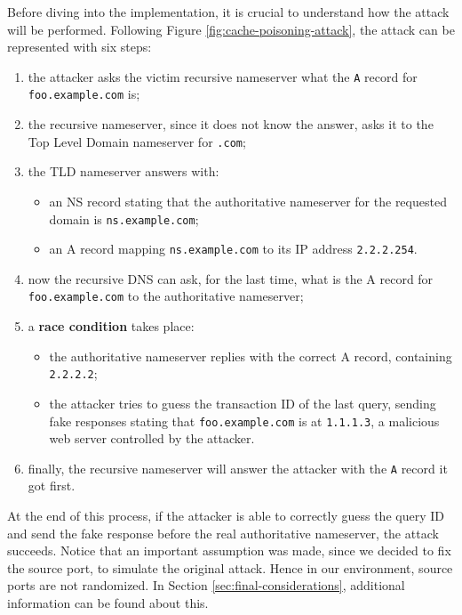\documentclass[11pt,a4paper]{article}
\begin{document}
\noindent
Before diving into the implementation, it is crucial to understand how the attack will be performed. Following Figure \ref{fig:cache-poisoning-attack}, the attack can be represented with six steps:
\begin{enumerate}
    \item the attacker asks the victim recursive nameserver what the \texttt{A} record for\\\texttt{foo.example.com} is;
    \item the recursive nameserver, since it does not know the answer, asks it to the Top Level Domain nameserver for \texttt{.com};
    \item the TLD nameserver answers with: 
    \begin{itemize}
        \item an NS record stating that the authoritative nameserver for the requested domain is \texttt{ns.example.com};
        \item an A record mapping \texttt{ns.example.com} to its IP address \texttt{2.2.2.254}.
    \end{itemize}
    \item now the recursive DNS can ask, for the last time, what is the A record for \texttt{foo.example.com} to the authoritative nameserver;
    \item a \textbf{race condition} takes place:
    \begin{itemize}
        \item the authoritative nameserver replies with the correct A record, containing \texttt{2.2.2.2};
        \item the attacker tries to guess the transaction ID of the last query, sending fake responses stating that \texttt{foo.example.com} is at \texttt{1.1.1.3}, a malicious web server controlled by the attacker.
    \end{itemize}
    \item finally, the recursive nameserver will answer the attacker with the \texttt{A} record it got first.
\end{enumerate}

\noindent
At the end of this process, if the attacker is able to correctly guess the query ID and send the fake response before the real authoritative nameserver, the attack succeeds. Notice that an important assumption was made, since we decided to fix the source port, to simulate the original attack. Hence in our environment, source ports are not randomized. In Section \ref{sec:final-considerations}, additional information can be found about this.
\end{document}
